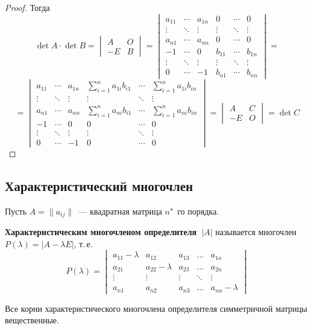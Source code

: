 \begin{proof}
Тогда
\begin{equation*}
\det A \cdot \det B =
\begin{vmatrix}
A & O \\
-E & B
\end{vmatrix} =
\begin{vmatrix}
a_{11} & \cdots & a_{1n} & 0 & \cdots & 0 \\
\vdots & \ddots & \vdots & \vdots & \ddots & \vdots \\
a_{n1} & \cdots & a_{nn} & 0 & \cdots & 0 \\
-1 & \cdots & 0 & b_{11} & \cdots & b_{1n} \\
\vdots & \ddots & \vdots & \vdots & \ddots & \vdots \\
0 & \cdots & -1 & b_{n1} & \cdots & b_{nn}
\end{vmatrix} =
\end{equation*}
\begin{equation*}
= \begin{vmatrix}
a_{11} & \cdots & a_{1n} & \sum\limits_{i=1}^n a_{1i} b_{i1} & \cdots & \sum\limits_{i=1}^n a_{1i} b_{in} \\
\vdots & \ddots & \vdots & \vdots & \ddots & \vdots \\
a_{n1} & \cdots & a_{nn} & \sum\limits_{i=1}^n a_{ni} b_{i1} & \cdots & \sum\limits_{i=1}^n a_{ni} b_{in} \\
-1 & \cdots & 0 & 0 & \cdots & 0 \\
\vdots & \ddots & \vdots & \vdots & \ddots & \vdots \\
0 & \cdots & -1 & 0 & \cdots & 0
\end{vmatrix} =
\begin{vmatrix}
A & C \\
-E & O
\end{vmatrix} =
\det C
\end{equation*}
\end{proof}

\subsection{Характеристический многочлен}
Пусть $A = \|a_{ij}\|$~--- квадратная матрица $n$"~го порядка.

 \textbf{Характеристическим многочленом определителя~$|A|$} называется многочлен~$P(\lambda) = |A - \lambda E|$, т.\,е.
\begin{equation*}
P(\lambda) =
\begin{vmatrix}
a_{11} - \lambda & a_{12} & a_{13} & \ldots & a_{1n} \\
a_{21} & a_{22} - \lambda & a_{23} & \ldots & a_{2n} \\
\vdots & \vdots & \vdots & \ddots & \vdots \\
a_{n1} & a_{n2} & a_{n3} & \ldots & a_{nn} - \lambda
\end{vmatrix}
\end{equation*}

\begin{theorem}
Все корни характеристического многочлена определителя симметричной матрицы вещественные.
\end{theorem}